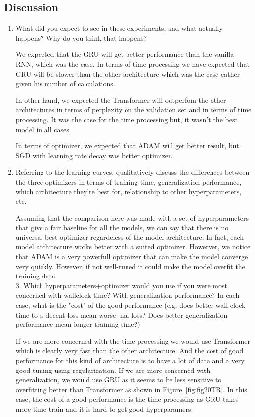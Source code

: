 \subsection{Discussion}
\begin{enumerate}
	\item What did you expect to see in these experiments, and what actually happens? Why do you
think that happens?

We expected that the GRU will get better performance than the vanilla RNN, which was the case. In terms of time processing we have expected that GRU will be slower than the other architecture  which was the case eather given his number of calculations.

In other hand, we expected the Transformer will outperfom the other architectures in terms of perplexity on the validation set and in terms of time processing. It was the case for the time processing but, it wasn't the best model in all cases.

In terms of optimizer, we expected that ADAM will get better result, but SGD with learning rate decay was better optimizer.

\item Referring to the learning curves, qualitatively discuss the differences between the three optimizers
in terms of training time, generalization performance, which architecture they're best
for, relationship to other hyperparameters, etc.

Assuming that the comparison here was made with a set of hyperparameters that give a fair baseline for all the models, we can say that there is no universal best optimizer regardeless of the model architecture. In fact, each model architecture works better with a suited optimizer. Howerver, we notice that ADAM is a very powerfull optimizer that can make the model converge very quickly. However, if not well-tuned it could make the model overfit the training data. \\

3. Which hyperparameters+optimizer would you use if you were most concerned with wallclock
time? With generalization performance? In each case, what is the "cost" of the good
performance (e.g. does better wall-clock time to a decent loss mean worse nal loss? Does
better generalization performance mean longer training time?)

If we are more concerned with the time processing we would use Transformer which is clearly very fast than the other architecture. And the cost of good performance for this kind of architecture is to have a lot of data and a very good tuning using regularization.
If we are more concerned with generalization, we would use GRU as it seems to be less sensitive to overfitting better than Transformer as shown in Figure~\ref{fig:fig20TR}. In this case, the cost of a good performance is the time processing as GRU takes more time train and it is hard to get good hyperparamers.


\end{enumerate}
